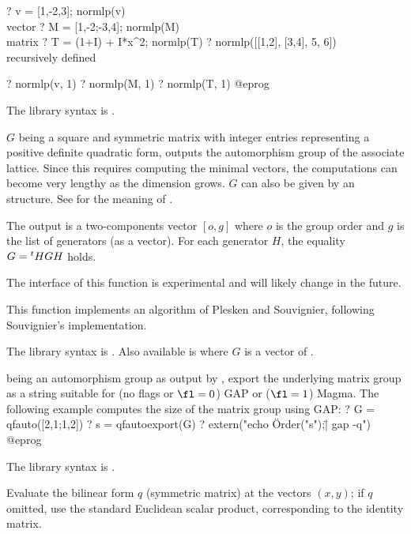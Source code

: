 \bprog
? v = [1,-2,3]; normlp(v)      \\ vector
? M = [1,-2;-3,4]; normlp(M)   \\ matrix
? T = (1+I) + I*x^2; normlp(T)
? normlp([[1,2], [3,4], 5, 6])   \\ recursively defined

? normlp(v, 1)
? normlp(M, 1)
? normlp(T, 1)
@eprog

The library syntax is .

\label{se:qfauto}
$G$ being a square and symmetric matrix with integer entries representing a
positive definite quadratic form, outputs the automorphism group of the
associate lattice.
Since this requires computing the minimal vectors, the computations can
become very lengthy as the dimension grows. $G$ can also be given by an
 structure.
See  for the meaning of .

The output is a two-components vector $[o,g]$ where $o$ is the group order
and $g$ is the list of generators (as a vector). For each generator $H$,
the equality $G={^t}H\*G\*H$ holds.

The interface of this function is experimental and will likely change in the
future.

This function implements an algorithm of Plesken and Souvignier, following
Souvignier's implementation.

The library syntax is .
Also available is 
where $G$ is a vector of .

\label{se:qfautoexport}
 being an automorphism group as output by
, export the underlying matrix group as a string suitable
for (no flags or $\fl=0$) GAP or ($\fl=1$) Magma. The following example
computes the size of the matrix group using GAP:
\bprog
? G = qfauto([2,1;1,2])
? s = qfautoexport(G)
? extern("echo \"Order("s");\" | gap -q")
@eprog

The library syntax is .

\label{se:qfbil}
Evaluate the bilinear form $q$ (symmetric matrix)
at the vectors $(x,y)$; if $q$ omitted, use the standard Euclidean scalar
product, corresponding to the identity matrix.

